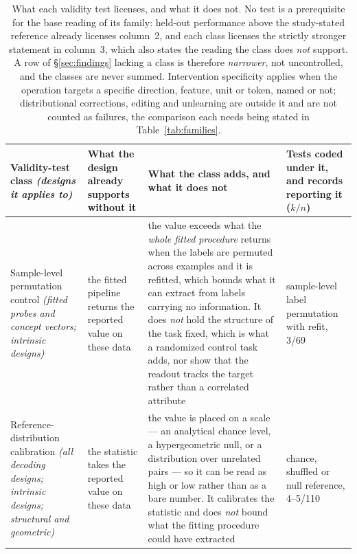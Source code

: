 \begin{table}
\centering\footnotesize\setlength\tabcolsep{4pt}\renewcommand{\arraystretch}{1.05}
\caption{What each validity test licenses, and what it does not. No test is a prerequisite for the base reading of its family: held-out performance above the study-stated reference already licenses column~2, and each class licenses the strictly stronger statement in column~3, which also states the reading the class does \emph{not} support. A row of \S\ref{sec:findings} lacking a class is therefore \emph{narrower}, not uncontrolled, and the classes are never summed. Intervention specificity applies when the operation targets a specific direction, feature, unit or token, named or not; distributional corrections, editing and unlearning are outside it and are not counted as failures, the comparison each needs being stated in Table~\ref{tab:families}.}
\label{tab:rubric}
\begin{tabular}{@{}L{3.0cm}L{3.6cm}L{10.5cm}L{3.6cm}@{}}
\toprule
Validity-test class \emph{(designs it applies to)} & What the design already supports without it & What the class adds, and what it does not & Tests coded under it, and records reporting it ($k/n$) \\
\midrule
Sample-level permutation control \emph{(fitted probes and concept vectors; intrinsic designs)} & the fitted pipeline returns the reported value on these data & the value exceeds what the \emph{whole fitted procedure} returns when the labels are permuted across examples and it is refitted, which bounds what it can extract from labels carrying no information. It does \emph{not} hold the structure of the task fixed, which is what a randomized control task adds, nor show that the readout tracks the target rather than a correlated attribute & sample-level label permutation with refit, 3/69 \\
Reference-distribution calibration \emph{(all decoding designs; intrinsic designs; structural and geometric)} & the statistic takes the reported value on these data & the value is placed on a scale --- an analytical chance level, a hypergeometric null, or a distribution over unrelated pairs --- so it can be read as high or low rather than as a bare number. It calibrates the statistic and does \emph{not} bound what the fitting procedure could have extracted & chance, shuffled or null reference, 4--5/110 \\

\end{tabular}
\end{table}
